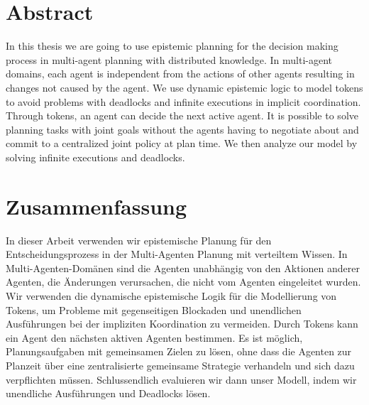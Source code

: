 \chapter*{Abstract}

In this thesis we are going to use epistemic planning for the decision making process in multi-agent planning with distributed knowledge. In multi-agent domains, each agent is independent from the actions of other agents resulting in changes not caused by the agent. We use dynamic epistemic logic to model tokens to avoid problems with deadlocks and infinite executions in implicit coordination.
Through tokens, an agent can decide the next active agent. It is possible to solve planning tasks with joint goals without the agents having to negotiate about and commit to a centralized joint policy at plan time. We then analyze our model by solving infinite executions and deadlocks.

\chapter*{Zusammenfassung}

In dieser Arbeit verwenden wir epistemische Planung für den Entscheidungsprozess in der Multi-Agenten Planung mit verteiltem Wissen. In Multi-Agenten-Domänen sind die Agenten unabhängig von den Aktionen anderer Agenten, die Änderungen verursachen, die nicht vom Agenten eingeleitet wurden.
Wir verwenden die dynamische epistemische Logik für die Modellierung von Tokens, um Probleme mit gegenseitigen Blockaden und unendlichen Ausführungen bei der impliziten Koordination zu vermeiden. Durch Tokens kann ein Agent den nächsten aktiven Agenten bestimmen. Es ist möglich, Planungsaufgaben mit gemeinsamen Zielen zu lösen, ohne dass die Agenten zur Planzeit über eine zentralisierte gemeinsame Strategie verhandeln und sich dazu verpflichten müssen. Schlussendlich evaluieren wir dann unser Modell, indem wir unendliche Ausführungen und Deadlocks lösen.

